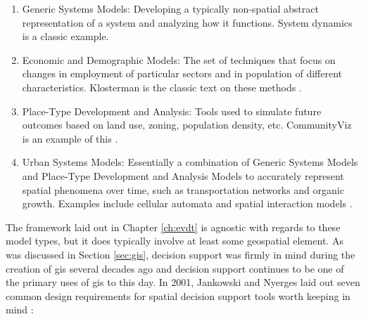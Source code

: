 \begin{enumerate}[itemsep=0pt,parsep=0pt]
	\item{Generic Systems Models: Developing a typically non-spatial abstract representation of a system and analyzing how it functions. System dynamics is a classic example.}
	\item{Economic and Demographic Models: The set of techniques that focus on changes in employment of particular sectors and in population of different characteristics. Klosterman is the classic text on these methods \cite{klostermanCommunityAnalysisPlanning1990}}.
	\item{Place-Type Development and Analysis: Tools used to simulate future outcomes based on land use, zoning, population density, etc. CommunityViz is an example of this \cite{walkerPlannersGuideCommunityViz2017}.}
	\item{Urban Systems Models: Essentially a combination of Generic Systems Models and Place-Type Development and Analysis Models to accurately represent spatial phenomena over time, such as transportation networks and organic growth. Examples include cellular automata and spatial interaction models \cite{battyCitiesComplexity2005}.}
\end{enumerate}

The framework laid out in Chapter \ref{ch:evdt} is agnostic with regards to these model types, but it does typically involve at least some geospatial element. As was discussed in Section \ref{sec:gis}, decision support was firmly in mind during the creation of \ac{gis} several decades ago and decision support continues to be one of the primary uses of \ac{gis} to this day. In 2001, Jankowski and Nyerges laid out seven common design requirements for spatial decision support tools worth keeping in mind \cite{jankowskiGISGroupDecision2001}:

